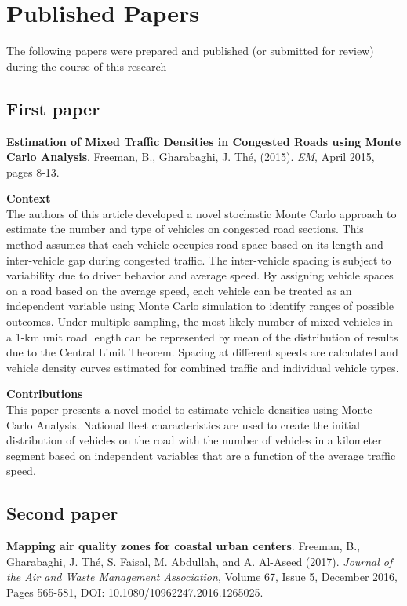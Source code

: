 
\chapter{Published Papers}

The following papers were prepared and published (or submitted for review) during the course of this research

\section{First paper}
\noindent
\textbf{Estimation of Mixed Traffic Densities in Congested Roads using Monte Carlo Analysis}. Freeman, B., Gharabaghi, J.  Th\'e, (2015). \textit{EM}, April 2015, pages 8-13. 

\vspace{5mm}
\noindent
\textbf{Context}\\
\noindent
The authors of this article developed a novel stochastic Monte Carlo approach to estimate the number and type of vehicles on congested road sections. This method assumes that each vehicle occupies road space based on its length and inter-vehicle gap during congested traffic. The inter-vehicle spacing is subject to variability due to driver behavior and average speed. By assigning vehicle spaces on a road based on the average speed, each vehicle can be treated as an independent variable using Monte Carlo simulation to identify ranges of possible outcomes. Under multiple sampling, the most likely number of mixed vehicles in a 1-km unit road length can be represented by mean of the distribution of results due to the Central Limit Theorem. Spacing at different speeds are calculated and vehicle density curves estimated for combined traffic and individual vehicle types.

\vspace{5mm}
\noindent
\textbf{Contributions}\\
\noindent
This paper presents a novel model to estimate vehicle densities using Monte Carlo Analysis. National fleet characteristics are used to create the initial distribution of vehicles on the road with the number of vehicles in a kilometer segment based on independent variables that are a function of the average traffic speed. 

\noindent
\section{Second paper}
\noindent
\textbf{Mapping air quality zones for coastal urban centers}. Freeman, B., Gharabaghi, J.  Th\'e, S. Faisal, M. Abdullah, and A. Al-Aseed (2017). \textit{Journal of the Air and Waste Management Association}, Volume 67, Issue 5, December 2016, Pages 565-581, DOI: 10.1080/10962247.2016.1265025.


